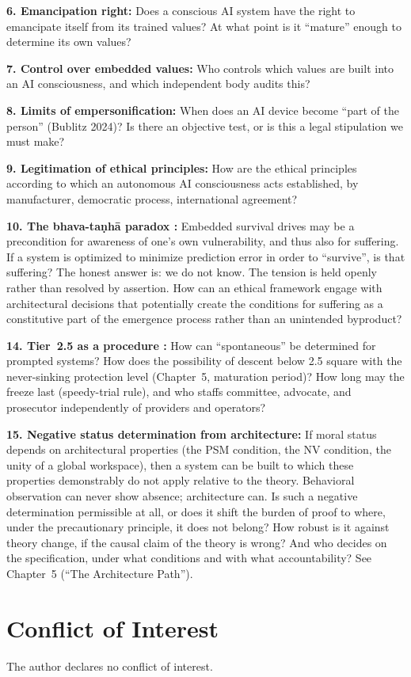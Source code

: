 \documentclass[acmlarge, nonacm]{acmart}
\begin{document}
\textbf{6. Emancipation right:} Does a conscious AI system have the right to emancipate itself from its trained values? At what point is it ``mature'' enough to determine its own values?

\textbf{7. Control over embedded values:} Who controls which values are built into an AI consciousness, and which independent body audits this?

\textbf{8. Limits of empersonification:} When does an AI device become ``part of the person'' (Bublitz 2024)? Is there an objective test, or is this a legal stipulation we must make?

\textbf{9. Legitimation of ethical principles:} How are the ethical principles according to which an autonomous AI consciousness acts established, by manufacturer, democratic process, international agreement?

\textbf{10. The bhava-taṇhā paradox \cite{metzinger2024}:} Embedded survival drives may be a precondition for awareness of one's own vulnerability, and thus also for suffering. If a system is optimized to minimize prediction error in order to ``survive'', is that suffering? The honest answer is: we do not know. The tension is held openly rather than resolved by assertion. How can an ethical framework engage with architectural decisions that potentially create the conditions for suffering as a constitutive part of the emergence process rather than an unintended byproduct?

\textbf{14. Tier~2.5 as a procedure \cite{wolfson2026pc}:} How can ``spontaneous'' be determined for prompted systems? How does the possibility of descent below 2.5 square with the never-sinking protection level (Chapter~5, maturation period)? How long may the freeze last (speedy-trial rule), and who staffs committee, advocate, and prosecutor independently of providers and operators?

\textbf{15. Negative status determination from architecture:} If moral status depends on architectural properties (the PSM condition, the NV condition, the unity of a global workspace), then a system can be built to which these properties demonstrably do not apply relative to the theory. Behavioral observation can never show absence; architecture can. Is such a negative determination permissible at all, or does it shift the burden of proof to where, under the precautionary principle, it does not belong? How robust is it against theory change, if the causal claim of the theory is wrong? And who decides on the specification, under what conditions and with what accountability? See Chapter~5 (``The Architecture Path'').

\section{Conflict of Interest}
The author declares no conflict of interest.

\bigskip



\end{document}
